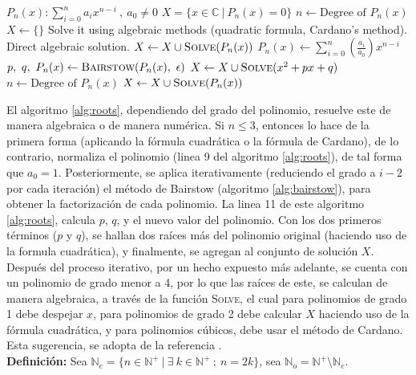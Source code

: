 \documentclass[11pt, spanish]{article}
\begin{document}
\begin{itemize}
\begin{algorithm}[h]
\caption{}
\label{alg:roots}
\begin{algorithmic}[1]
\Require $P_n(x) : \sum_{i = 0}^{n} a_ix^{n - i}\ ,\ a_0 \neq 0 $
\Ensure $X = \{ x \in \mathbb{C}\ |\ P_{n}(x) = 0\}$
\State $n \gets \text{Degree of } P_n(x)$
\State $X \gets \{ \}$
\State Solve it using algebraic methods (quadratic formula, Cardano's method).
\State Direct algebraic solution.
\State $X\gets X \cup \textsc{Solve}(P_n(x))$
\Else
\State $ P_n(x) \gets \sum_{i = 0}^{n} \left(\frac{a_i}{a_0}\right)x^{n - i}$
\State $p,\ q,\ P_n(x) \gets \textsc{Bairstow}(P_n(x),\ \epsilon)$
\State $X \gets X \cup \textsc{Solve}(x^2+px+q)$
\State $n \gets \text{Degree of } P_n(x)$
\EndWhile
\State $X\gets X \cup \textsc{Solve}(P_n(x))$
\EndIf
{}
\EndProcedure
\end{algorithmic}
\end{algorithm}

El algoritmo \ref{alg:roots}, dependiendo del grado del polinomio, resuelve este de manera algebraica o de manera numérica. Si $n \leq 3$, entonces lo hace de la primera forma (aplicando la fórmula cuadrática o la fórmula de Cardano), de lo contrario, normaliza el polinomio (linea 9 del algoritmo \ref{alg:roots}), de tal forma que $a_0 = 1$. Posteriormente, se aplica iterativamente (reduciendo el grado a $i - 2$ por cada iteración) el método de Bairstow (algoritmo \ref{alg:bairstow}), para obtener la factorización de cada polinomio. La linea 11 de este algoritmo \ref{alg:roots}, calcula $p$, $q$, y el nuevo valor del polinomio. Con los dos primeros términos ($p$ y $q$), se hallan dos raíces más del polinomio original (haciendo uso de la formula cuadrática), y finalmente, se agregan al conjunto de solución $X$. Después del proceso iterativo, por un hecho expuesto más adelante, se cuenta con un polinomio de grado menor a 4, por lo que las raíces de este, se calculan de manera algebraica, a través de la función \textsc{Solve}, el cual para polinomios de grado 1 debe despejar $x$, para polinomios de grado 2 debe calcular $X$ haciendo uso de la fórmula cuadrática, y para polinomios cúbicos, debe usar el método de Cardano. Esta sugerencia, se adopta de la referencia \cite{rosloniec2008fundamental}.\\

\textbf{Definición:} Sea $\mathbb{N}_e = \{n \in \mathbb{N}^+\ |\ \exists\ k \in \mathbb{N}^+\ ;\ n = 2 k\}$, sea $\mathbb{N}_o = \mathbb{N}^+ \setminus \mathbb{N}_e  $.\\


\end{itemize}
\end{document}
